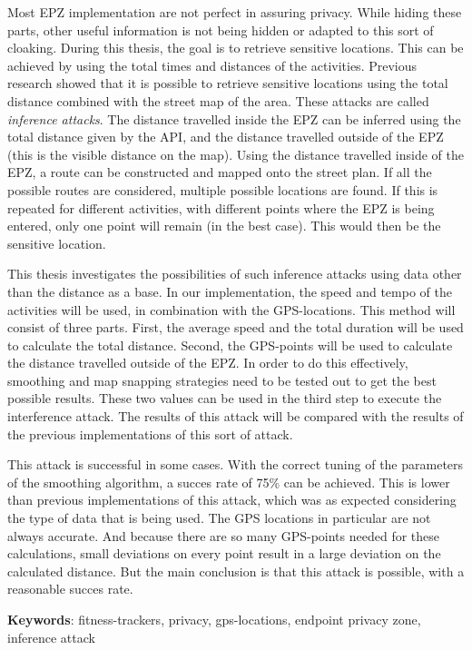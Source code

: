 Most EPZ implementation are not perfect in assuring privacy. While hiding these
parts, other useful information is not being hidden or adapted to this sort of
cloaking. During this thesis, the goal is to retrieve sensitive locations. This
can be achieved by using the total times and distances of the activities.
Previous research showed that it is possible to retrieve sensitive locations
using the total distance combined with the street map of the area. These
attacks are called \textit{inference attacks}. The distance travelled inside
the EPZ can be inferred using the total distance given by the API, and the
distance travelled outside of the EPZ (this is the visible distance on the
map). Using the distance travelled inside of the EPZ, a route can be
constructed and mapped onto the street plan. If all the possible routes are
considered, multiple possible locations are found. If this is repeated for
different activities, with different points where the EPZ is being entered,
only one point will remain (in the best case). This would then be the sensitive
location.

This thesis investigates the possibilities of such inference attacks using data
other than the distance as a base. In our implementation, the speed and tempo
of the activities will be used, in combination with the GPS-locations. This
method will consist of three parts. First, the average speed and the total
duration will be used to calculate the total distance. Second, the GPS-points
will be used to calculate the distance travelled outside of the \ac{EPZ}. In
order to do this effectively, smoothing and map snapping strategies need to be
tested out to get the best possible results. These two values can be used in
the third step to execute the interference attack. The results of this attack
will be compared with the results of the previous implementations of this sort
of attack.

This attack is successful in some cases. With the correct tuning of the
parameters of the smoothing algorithm, a succes rate of 75\% can be achieved.
This is lower than previous implementations of this attack, which was as
expected considering the type of data that is being used. The GPS locations in
particular are not always accurate. And because there are so many GPS-points
needed for these calculations, small deviations on every point result in a
large deviation on the calculated distance. But the main conclusion is that
this attack is possible, with a reasonable succes rate.

\textbf{Keywords}: fitness-trackers, privacy, gps-locations, endpoint privacy zone, inference attack